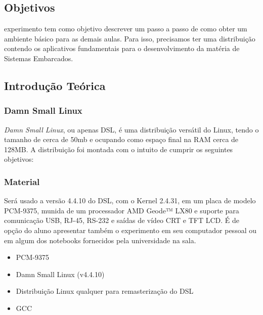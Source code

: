 ﻿%



%
%
\nocite{dsl} %
\subsection{Objetivos}\label{obj}

 experimento tem como objetivo descrever um passo a passo de como obter um ambiente básico para as demais aulas. Para isso, precisamos ter uma distribuição contendo os aplicativos fundamentais para o desenvolvimento da matéria de Sistemas Embarcados.
	
\subsection{Introdução Teórica}\label{intro}	
\subsubsection{Damn Small Linux}\label{dsl}
\textit{Damn Small Linux}, ou apenas DSL, é uma distribuição versátil do Linux, tendo o tamanho de cerca de 50mb e ocupando como espaço final na RAM cerca de 128MB. A distribuição foi montada com o intuito de cumprir os seguintes objetivos:
	

\subsubsection{Material}\label{mat}
Será usado a versão 4.4.10 do DSL, com o Kernel 2.4.31, em um placa de modelo PCM-9375, munida de um processador AMD Geode™ LX80 e suporte para comunicação USB, RJ-45, RS-232 e saídas de vídeo CRT e TFT LCD. É de opção do aluno apresentar também o experimento em seu computador pessoal ou em algum dos notebooks fornecidos pela universidade na sala.
	
\begin{itemize}
	\item PCM-9375
	\item Damn Small Linux (v4.4.10)
	\item Distribuição Linux qualquer para remasterização do DSL
	\item GCC
\end{itemize}	
	




